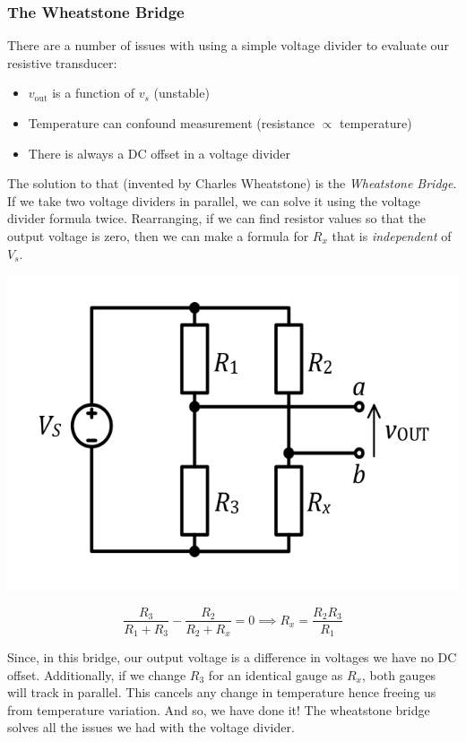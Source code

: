 \documentclass[12pt]{article}
\begin{document}
\subsubsection{The Wheatstone Bridge}
There are a number of issues with using a simple voltage divider to evaluate our resistive transducer:
\begin{itemize}
  \item $v_{\text{out}}$ is a function of $v_s$ (unstable)
  \item Temperature can confound measurement (resistance $\propto$ temperature)
  \item There is always a DC offset in a voltage divider
\end{itemize}

The solution to that (invented by Charles Wheatstone) is the \textit{Wheatstone Bridge}.
If we take two voltage dividers in parallel, we can solve it using the voltage divider formula twice. 
Rearranging, if we can find resistor values so that the output voltage is zero, then we can make a formula for $R_x$ that is \textit{independent} of $V_s$.

\begin{marginfigure}
  \vspace{ -2cm }
  \includegraphics[scale=0.3]{wheatstone}
\end{marginfigure}

\begin{equation*}
  \frac{R_3}{R_1+R_3} - \frac{R_2}{R_2 + R_x} = 0 \implies R_x = \frac{R_2R_3}{R_1}
\end{equation*}

Since, in this bridge, our output voltage is a difference in voltages we have no DC offset. 
Additionally, if we change $R_3$ for an identical gauge as $R_x$, both gauges will track in parallel.
This cancels any change in temperature hence freeing us from temperature variation.
And so, we have done it! The wheatstone bridge solves all the issues we had with the voltage divider.
\end{document}
